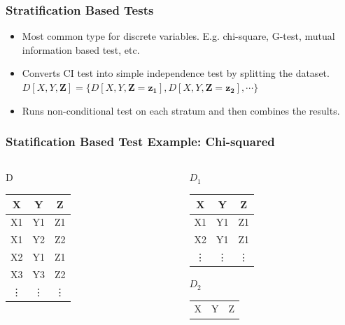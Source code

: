 \documentclass{beamer}
\begin{document}
\begin{frame}
	\frametitle{Stratification Based Tests}
	\begin{itemize}
		\setlength\itemsep{1em}
		\item Most common type for discrete variables. E.g. chi-square, G-test,
			mutual information based test, etc. 
		\item Converts CI test into simple independence test by splitting 
			the dataset.
		$ D[X, Y, \bm{Z}] = \{ D[X, Y, \bm{Z}=\bm{z_1}], D[X, Y, \bm{Z}=\bm{z_2}], \cdots \} $	
		\item Runs non-conditional test on each stratum and then combines the results.
	\end{itemize}
\end{frame}

\begin{frame}
	\frametitle{Statification Based Test Example: Chi-squared}
	\begin{block}{}
	\begin{columns}
		\begin{column}{0.25 \textwidth}
			\begin{block}{\centering D}
			\begin{tabular}{c c c}
				X  & Y  & Z \\
				\hline
				X1 & Y1 & Z1 \\
				X1 & Y2 & Z2 \\
				X2 & Y1 & Z1 \\
				X3 & Y3 & Z2 \\
				\vdots & \vdots & \vdots \\
			\end{tabular}
			\end{block}
		\end{column}
		\begin{column}{0.25 \textwidth}
			\begin{block}{\centering $D_1$}
				\begin{tabular}{c c c}
					X & Y & Z \\
					\hline
					X1 & Y1 & Z1 \\
					X2 & Y1 & Z1 \\
					\vdots & \vdots & \vdots \\
				\end{tabular}
			\end{block}
			\begin{block}{\centering $ D_2 $}
				\begin{tabular}{c c c}
					X & Y & Z \\

\end{tabular}
\end{block}
\end{column}
\end{columns}
\end{block}
\end{frame}
\end{document}
